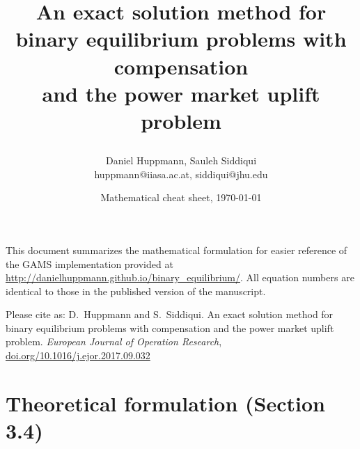 \documentclass[9pt,a4paper]{article}
\title{\Large An exact solution method for \\ binary equilibrium problems with compensation \\ 
	and the power market uplift problem
\author{\normalsize Daniel Huppmann, Sauleh Siddiqui \\
	\small huppmann@iiasa.ac.at, siddiqui@jhu.edu
}
\date{\normalsize Mathematical cheat sheet, \today}
}
\begin{document}
\maketitle

This document summarizes the mathematical formulation for easier reference of the GAMS implementation provided at \url{http://danielhuppmann.github.io/binary_equilibrium/}. All equation numbers are identical to those in the published version of the manuscript.

\vspace{4 pt} \noindent
Please cite as: 
\newline 
D.~Huppmann and S.~Siddiqui. 
An exact solution method for binary equilibrium problems with compensation
and the power market uplift problem. 
\newline
\emph{European Journal of Operation Research}, \href{https://dx.doi.org/10.1016/j.ejor.2017.09.032}{doi.org/10.1016/j.ejor.2017.09.032}

\section*{Theoretical formulation (Section 3.4)}
\end{document}
